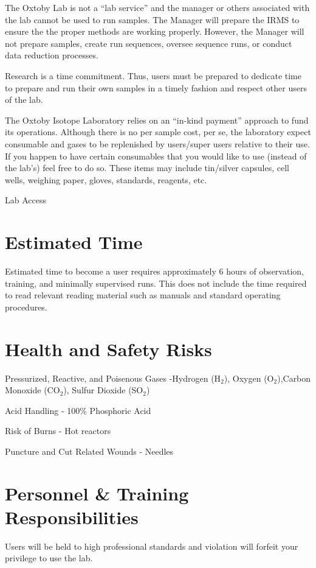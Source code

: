 \documentclass[12pt]{../SOP3_beta}\usepackage[]{graphicx}\usepackage[]{color}
\begin{document}
\NP The Oxtoby Lab is not a ``lab service'' and the manager or others associated with the lab cannot be used to run samples. The Manager will prepare the IRMS to ensure the the proper methods are working properly. However, the Manager will not prepare samples, create run sequences, oversee sequence runs, or conduct data reduction processes. 

\NP Research is a time commitment. Thus, users must be prepared to dedicate time to prepare and run their own samples in a timely fashion and respect other users of the lab. 

\NP The Oxtoby Isotope Laboratory relies on an ``in-kind payment'' approach to fund its operations. Although there is no per sample cost, per se, the laboratory expect consumable and gases to be replenished by users/super users relative to their use. If you happen to have certain consumables that you would like to use (instead of the lab's) feel free to do so. These items may include tin/silver capsules, cell wells, weighing paper, gloves, standards, reagents, etc.

\NP Lab Access

\section{Estimated Time}

\NP Estimated time to become a user requires approximately 6 hours of observation, training, and minimally supervised runs. This does not include the time required to read relevant reading material such as manuals and standard operating procedures.

\section{Health and Safety Risks}

\NP Pressurized, Reactive, and Poisenous Gases -Hydrogen (H$_2$), Oxygen (O$_2$),Carbon Monoxide (CO$_2$), Sulfur Dioxide (SO$_2$)

\NP Acid Handling - 100\% Phosphoric Acid

\NP Risk of Burns - Hot reactors

\NP Puncture and Cut Related Wounds - Needles

\section{Personnel \& Training Responsibilities}

\NP Users will be held to high professional standards and violation will forfeit your privilege to use the lab.
\end{document}
